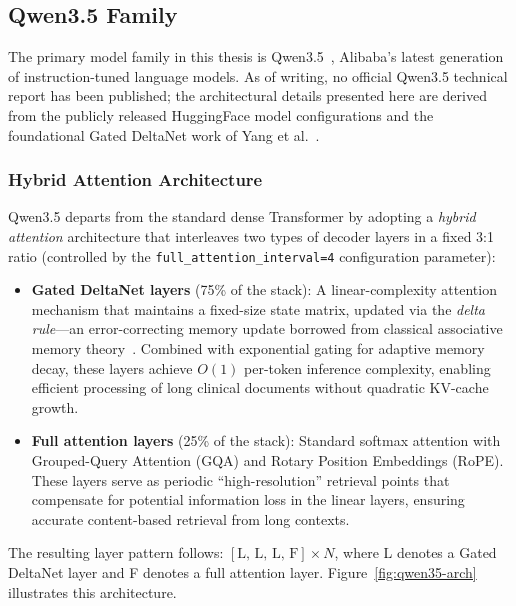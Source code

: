 \documentclass[12pt,a4paper,oneside]{report}
\begin{document}
\subsection{Qwen3.5 Family}
\label{subsec:qwen35}

The primary model family in this thesis is Qwen3.5~\cite{yang2024qwen25}, Alibaba's latest generation of instruction-tuned language models. As of writing, no official Qwen3.5 technical report has been published; the architectural details presented here are derived from the publicly released HuggingFace model configurations and the foundational Gated DeltaNet work of Yang et al.~\cite{yang2025gatedeltanet}.

\subsubsection{Hybrid Attention Architecture}

Qwen3.5 departs from the standard dense Transformer by adopting a \textit{hybrid attention} architecture that interleaves two types of decoder layers in a fixed 3:1 ratio (controlled by the \texttt{full\_attention\_interval=4} configuration parameter):

\begin{itemize}
    \item \textbf{Gated DeltaNet layers} (75\% of the stack): A linear-complexity attention mechanism that maintains a fixed-size state matrix, updated via the \textit{delta rule}---an error-correcting memory update borrowed from classical associative memory theory~\cite{yang2025gatedeltanet}. Combined with exponential gating for adaptive memory decay, these layers achieve $O(1)$ per-token inference complexity, enabling efficient processing of long clinical documents without quadratic KV-cache growth.

    \item \textbf{Full attention layers} (25\% of the stack): Standard softmax attention with Grouped-Query Attention (GQA) and Rotary Position Embeddings (RoPE). These layers serve as periodic ``high-resolution'' retrieval points that compensate for potential information loss in the linear layers, ensuring accurate content-based retrieval from long contexts.
\end{itemize}

The resulting layer pattern follows: $[\text{L, L, L, F}] \times N$, where L denotes a Gated DeltaNet layer and F denotes a full attention layer. Figure~\ref{fig:qwen35-arch} illustrates this architecture.
\end{document}
